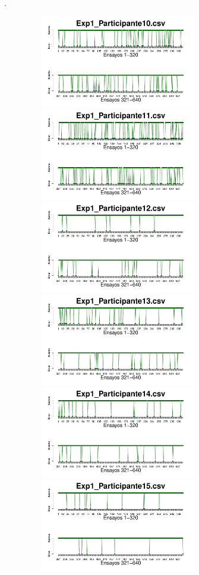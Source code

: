 \documentclass[a4paper ]{article}
\begin{document}
\vfill .
\begin{figure}[th]
\begin{center}
\includegraphics[width=8cm, height=4cm]{Figures/Success_Exp1_P10} \includegraphics[width=8cm, height=4cm]{Figures/Success_Exp1_P11} \includegraphics[width=8cm, height=4cm]{Figures/Success_Exp1_P12}
\includegraphics[width=8cm, height=4cm]{Figures/Success_Exp1_P13} \includegraphics[width=8cm, height=4cm]{Figures/Success_Exp1_P14} \includegraphics[width=8cm, height=4cm]{Figures/Success_Exp1_P15}

\end{center}
\end{figure}
\end{document}

